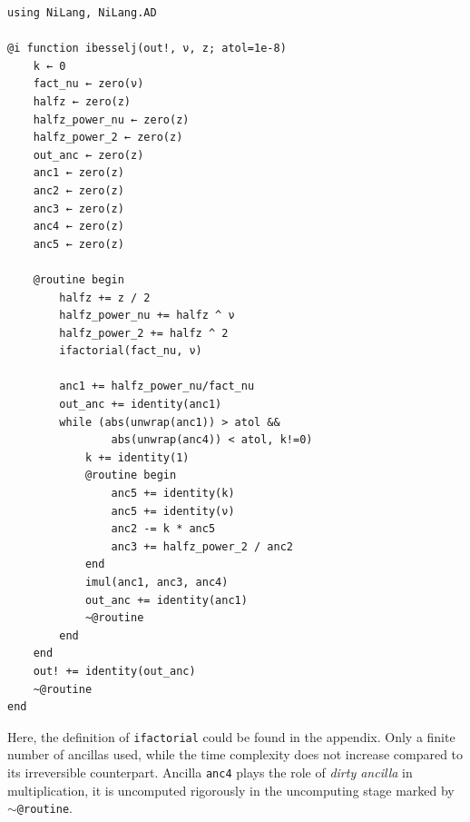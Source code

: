 \documentclass[aps,twocolumn,longbibliography,english,superscriptaddress]{revtex4-1}
\newcommand{\<}{\langle}
\renewcommand{\>}{\rangle}
\theoremstyle{definition}\newtheorem{definition}{\textit{Definition}}
\begin{document}
\begin{minipage}{.44\textwidth}
\begin{lstlisting}
using NiLang, NiLang.AD

@i function ibesselj(out!, ν, z; atol=1e-8)
    k ← 0
    fact_nu ← zero(ν)
    halfz ← zero(z)
    halfz_power_nu ← zero(z)
    halfz_power_2 ← zero(z)
    out_anc ← zero(z)
    anc1 ← zero(z)
    anc2 ← zero(z)
    anc3 ← zero(z)
    anc4 ← zero(z)
    anc5 ← zero(z)

    @routine begin
        halfz += z / 2
        halfz_power_nu += halfz ^ ν
        halfz_power_2 += halfz ^ 2
        ifactorial(fact_nu, ν)

        anc1 += halfz_power_nu/fact_nu
        out_anc += identity(anc1)
        while (abs(unwrap(anc1)) > atol &&
                abs(unwrap(anc4)) < atol, k!=0)
            k += identity(1)
            @routine begin
                anc5 += identity(k)
                anc5 += identity(ν)
                anc2 -= k * anc5
                anc3 += halfz_power_2 / anc2
            end
            imul(anc1, anc3, anc4)
            out_anc += identity(anc1)
            ~@routine
        end
    end
    out! += identity(out_anc)
    ~@routine
end
\end{lstlisting}
\end{minipage}

Here, the definition of \texttt{ifactorial} could be found in the appendix. Only a finite number of ancillas used, while the time complexity does not increase compared to its irreversible counterpart.
Ancilla \texttt{anc4} plays the role of \textit{dirty ancilla} in multiplication, it is uncomputed rigorously in the uncomputing stage marked by \texttt{$\sim$@routine}.
\end{document}

